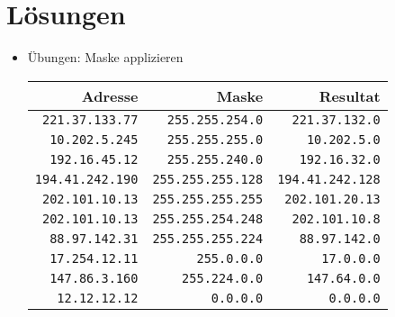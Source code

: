 \documentclass[a4paper,german]{scrartcl}
\begin{document}
\cleardoublepage

\section{L\"osungen}

\begin{itemize}
   \item \"Ubungen: Maske applizieren
      \begin{center}
        \begin{tabular}{rrr}
          Adresse & Maske & Resultat \\
          \hline
          \texttt{221.37.133.77} & \texttt{255.255.254.0} & \texttt{221.37.132.0} \\
          \texttt{10.202.5.245} & \texttt{255.255.255.0} & \texttt{10.202.5.0} \\
          \texttt{192.16.45.12} & \texttt{255.255.240.0} & \texttt{192.16.32.0} \\
          \texttt{194.41.242.190} & \texttt{255.255.255.128} & \texttt{194.41.242.128} \\
          \texttt{202.101.10.13} & \texttt{255.255.255.255} & \texttt{202.101.20.13} \\
          \texttt{202.101.10.13} & \texttt{255.255.254.248} & \texttt{202.101.10.8} \\
          \texttt{88.97.142.31} & \texttt{255.255.255.224} & \texttt{88.97.142.0} \\
          \texttt{17.254.12.11} & \texttt{255.0.0.0} & \texttt{17.0.0.0} \\
          \texttt{147.86.3.160} & \texttt{255.224.0.0} & \texttt{147.64.0.0} \\
          \texttt{12.12.12.12} & \texttt{0.0.0.0} & \texttt{0.0.0.0} \\
          \hline
        \end{tabular}
      \end{center}
      \vspace{0.25cm}


\end{itemize}
\end{document}

